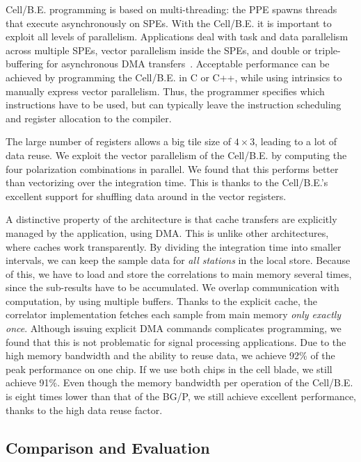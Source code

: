 \documentclass{article}
\begin{document}
\mbox{Cell/B.E.} programming is based on multi-threading:
the PPE spawns threads that execute asynchronously on SPEs.  With the
\mbox{Cell/B.E.} it is important to exploit all levels of parallelism.
Applications deal with task and data parallelism across multiple SPEs,
vector parallelism inside the SPEs, and double or triple-buffering for
asynchronous DMA transfers~\cite{cell}.  Acceptable performance can be achieved by
programming the \mbox{Cell/B.E.}  in C or C++, while using intrinsics
to manually express vector parallelism.  Thus, the programmer
specifies which instructions have to be used, but can typically leave
the instruction scheduling and register allocation to the compiler.

The large number of registers allows a big tile size of 
$4\times3$, leading to a lot of data reuse.
We exploit the vector parallelism of the \mbox{Cell/B.E.} by computing the four
polarization combinations in parallel.  We found that this performs
better than vectorizing over the integration time.  This is thanks to the \mbox{Cell/B.E.}'s
excellent support for shuffling data around in the vector registers.

A distinctive property of the architecture is that cache transfers are
explicitly managed by the application, using DMA. This is unlike other 
architectures, where caches work transparently.
By dividing the
integration time into smaller intervals, we can keep the sample data
for \emph{all stations} in the local store.  
Because of this, we have to load and store the correlations to main
memory several times, since the sub-results have to
be accumulated.  
We overlap communication with computation, by using multiple buffers.
Thanks to the explicit cache,
the correlator implementation fetches each sample from main memory
\emph{only exactly once}. 
Although issuing explicit DMA commands complicates programming,
we found that this is not problematic for signal processing applications.
Due to the high
memory bandwidth and the ability to reuse data, we achieve 92\% of the peak
performance on one chip.  If we use both chips in the cell blade, we still achieve
91\%.  Even though the memory
bandwidth per operation of the \mbox{Cell/B.E.} is eight times lower than
that of the BG/P, we still achieve excellent performance, thanks to
the high data reuse factor.


\subsection{Comparison and Evaluation}
\label{sec:perf-compare}
\end{document}
